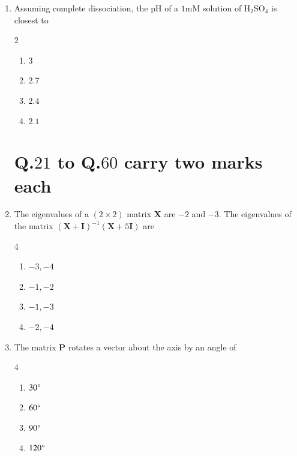 \documentclass[journal,12pt,onecolumn]{IEEEtran}
\theoremstyle{remark}
\begin{document}
\begin{enumerate}
\vspace{0.5cm}
\item Assuming complete dissociation, the pH of a $1\text{mM}$ solution of $\mathrm{H_2SO_4}$ is closest to \par \hfill{}
\begin{multicols}{2}
    \begin{enumerate}
        \item $3$
        \item $2.7$
        \item $2.4$
        \item $2.1$
\end{enumerate}
\end{multicols}

\vspace{0.5cm}

\section*{\textbf{Q.$21$ to Q.$60$ carry two marks each}}

\vspace{0.5cm}
\item The eigenvalues of a $(2\times2)$ matrix \textbf{X} are $-2$ and $-3$. The eigenvalues of the matrix $(\textbf{X}+\textbf{I})^{-1}(\textbf{X}+5\textbf{I})$ are \par \hfill{}
\begin{multicols}{4} 
    \begin{enumerate}
        \item $-3, -4$
        \item $-1,-2$
        \item $-1,-3$
        \item $-2,-4$
\end{enumerate}
\end{multicols}

\vspace{0.5cm}
\item The matrix \textbf{P} 
 rotates a vector about the axis  by an angle of \par \hfill{}
\begin{multicols}{4}
    \begin{enumerate}
        \item $30\degree$
        \item $60\degree$
        \item $90\degree$
        \item $120\degree$
\end{enumerate}
\end{multicols}


\end{enumerate}
\end{document}
